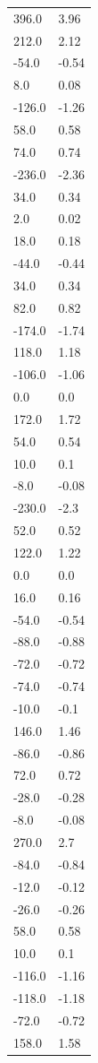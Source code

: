 \begin{longtable}{ll}
396.0 & 3.96 \\
212.0 & 2.12 \\
-54.0 & -0.54 \\
8.0 & 0.08 \\
-126.0 & -1.26 \\
58.0 & 0.58 \\
74.0 & 0.74 \\
-236.0 & -2.36 \\
34.0 & 0.34 \\
2.0 & 0.02 \\
18.0 & 0.18 \\
-44.0 & -0.44 \\
34.0 & 0.34 \\
82.0 & 0.82 \\
-174.0 & -1.74 \\
118.0 & 1.18 \\
-106.0 & -1.06 \\
0.0 & 0.0 \\
172.0 & 1.72 \\
54.0 & 0.54 \\
10.0 & 0.1 \\
-8.0 & -0.08 \\
-230.0 & -2.3 \\
52.0 & 0.52 \\
122.0 & 1.22 \\
0.0 & 0.0 \\
16.0 & 0.16 \\
-54.0 & -0.54 \\
-88.0 & -0.88 \\
-72.0 & -0.72 \\
-74.0 & -0.74 \\
-10.0 & -0.1 \\
146.0 & 1.46 \\
-86.0 & -0.86 \\
72.0 & 0.72 \\
-28.0 & -0.28 \\
-8.0 & -0.08 \\
270.0 & 2.7 \\
-84.0 & -0.84 \\
-12.0 & -0.12 \\
-26.0 & -0.26 \\
58.0 & 0.58 \\
10.0 & 0.1 \\
-116.0 & -1.16 \\
-118.0 & -1.18 \\
-72.0 & -0.72 \\
158.0 & 1.58 \\

\end{longtable}
